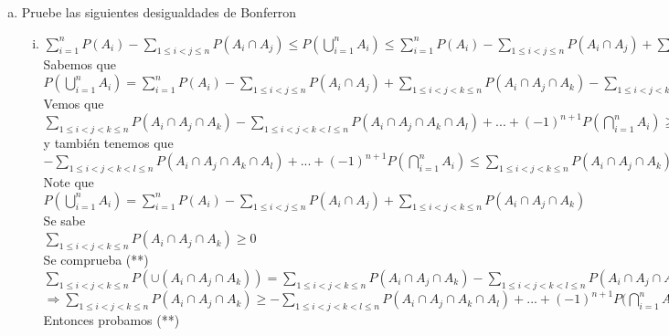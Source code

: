 \documentclass[12pt]{article}
\begin{document}
\begin{enumerate}
\begin{enumerate}[a)]
\item Pruebe las siguientes desigualdades de Bonferron\\[0.2cm]
\begin{enumerate}[i)]
\item $\displaystyle \sum_{i=1}^{n}P(A_i)- \displaystyle \sum_{1\leqslant i<j \leqslant n}P(A_i\cap A_j)\leqslant P(\displaystyle\bigcup_{i=1}^{n}A_i)\leqslant \displaystyle \sum_{i=1}^{n}P(A_i)-\displaystyle \sum_{1\leqslant i<j \leqslant n}P(A_i\cap A_j)+ \displaystyle \sum_{1\leqslant i<j<k \leqslant n}P(A_i\cap A_j \cap A_k)$\\
Sabemos que\\
$P(\displaystyle\bigcup_{i=1}^{n}A_i)=\displaystyle \sum_{i=1}^{n}P(A_i)-\displaystyle \sum_{1\leqslant i<j \leqslant n}P(A_i\cap A_j)+\displaystyle \sum_{1\leqslant i<j<k \leqslant n}P(A_i\cap A_j \cap A_k)-\displaystyle \sum_{1\leqslant i<j<k<l \leqslant n}P(A_i\cap A_j \cap A_k\cap A_l)+...+(-1)^{n+1} P(\displaystyle\bigcap_{i=1}^{n}A_i)$\\
Vemos que \\
$\displaystyle \sum_{1\leqslant i<j<k \leqslant n}P(A_i\cap A_j \cap A_k)-\displaystyle \sum_{1\leqslant i<j<k<l \leqslant n}P(A_i\cap A_j \cap A_k\cap A_l)+...+(-1)^{n+1} P(\displaystyle\bigcap_{i=1}^{n}A_i)\geqslant 0..........(*)$\\
y también tenemos que\\
$-\displaystyle \sum_{1\leqslant i<j<k<l \leqslant n}P(A_i\cap A_j \cap A_k\cap A_l)+...+(-1)^{n+1} P(\displaystyle\bigcap_{i=1}^{n}A_i)\leqslant \displaystyle \sum_{1\leqslant i<j<k \leqslant n}P(A_i\cap A_j \cap A_k)................(**) $\\
Note que\\
$P(\displaystyle\bigcup_{i=1}^{n}A_i)=\displaystyle \sum_{i=1}^{n}P(A_i)-\displaystyle \sum_{1\leqslant i<j \leqslant n}P(A_i\cap A_j)+\displaystyle \sum_{1\leqslant i<j<k \leqslant n}P(A_i\cap A_j \cap A_k)$\\
Se sabe\\
$\displaystyle \sum_{1\leqslant i<j<k \leqslant n}
P(A_i\cap A_j \cap A_k)\geqslant 0$\\
Se comprueba (**)\\
$\displaystyle \sum_{1\leqslant i<j<k \leqslant n}P(\cup(A_i\cap A_j \cap A_k))=\displaystyle \sum_{1\leqslant i<j<k \leqslant n}P(A_i\cap A_j \cap A_k)-\displaystyle \sum_{1\leqslant i<j<k<l \leqslant n}P(A_i\cap A_j \cap A_k\cap A_l)+...+(-1)^{n+1} P(\displaystyle\bigcap_{i=1}^{n}A_i)\geqslant 0$\\
$\Rightarrow\displaystyle \sum_{1\leqslant i<j<k \leqslant n}P(A_i\cap A_j \cap A_k)\geqslant - \displaystyle \sum_{1\leqslant i<j<k<l \leqslant n}P(A_i\cap A_j \cap A_k\cap A_l)+...+(-1)^{n+1} P(\displaystyle\bigcap_{i=1}^{n}A_i$\\
Entonces probamos (**)\\[0.2cm]


\end{enumerate}
\end{enumerate}
\end{enumerate}
\end{document}
